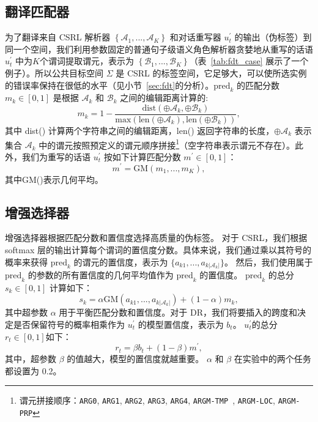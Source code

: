 \subsection{翻译匹配器}
为了翻译来自 CSRL 解析器 $\left\{\mathcal{A}_1, ..., \mathcal{A}_K\right\}$ 和对话重写器 $u_t^{\prime}$ 的输出（伪标签）到同一个空间，我们利用参数固定的普通句子级语义角色解析器贪婪地从重写的话语 $u_t^{\prime}$ 中为$K$个谓词提取谓元，表示为 $\left\{\mathcal{B}_1, ..., \mathcal{B}_K\right\}$（表~\ref{tab:fdt_case} 展示了一个例子）。所以公共目标空间 $\Sigma$ 是 CSRL 的标签空间，它足够大，可以使所选实例的错误率保持在很低的水平（见小节~\ref{sec:fdt}的分析）。$\text{pred}_k$ 的匹配分数 $m_{k} \in [0,1]$ 是根据 $\mathcal{A}_k$ 和 $\mathcal{B}_k$ 之间的编辑距离计算的:
\begin{equation}
    m_{k} = 1 - \frac{\textrm{dist}(\oplus \mathcal{A}_k, \oplus \mathcal{B}_k)}{\textrm{max}(\textrm{len}(\oplus \mathcal{A}_k), \textrm{len}(\oplus \mathcal{B}_k))}, \nonumber
\end{equation}
其中 dist() 计算两个字符串之间的编辑距离，\textrm{len()} 返回字符串的长度，$\oplus \mathcal{A}_k$ 表示集合 $\mathcal{A}_k$ 中的谓元按照预定义的谓元顺序拼接\footnote{谓元拼接顺序：\texttt{ARG0}, \texttt{ARG1}, \texttt{ARG2}, \texttt{ARG3}, \texttt{ARG4}, \texttt{ARGM-TMP }, \texttt{ARGM-LOC}, \texttt{ARGM-PRP}}（空字符串表示谓元不存在）。此外，我们为重写的话语 $u_t^{\prime}$ 按如下计算匹配分数 $m^{\prime} \in [0,1]$：
\begin{equation}
    m^{\prime} = \textrm{GM}(m_1,...,m_K), \nonumber
\end{equation}
其中GM()表示几何平均。

\subsection{增强选择器}
增强选择器根据匹配分数和置信度选择高质量的伪标签。 对于 CSRL，我们根据 softmax 层的输出计算每个谓词的置信度分数。具体来说，我们通过乘以其符号的概率来获得 $\text{pred}_k$ 的谓元的置信度，表示为 $\{a_{k1}, ..., a_{k|\mathcal{A}_k |}\}$。 然后，我们使用属于 $\text{pred}_k$ 的参数的所有置信度的几何平均值作为 $\text{pred}_k$ 的置信度。 $\text{pred}_k$ 的总分 $s_{k} \in [0,1]$ 计算如下：
\begin{equation}
    s_k = \alpha \textrm{GM}(a_{k1}, ..., a_{k|\mathcal{A}_k|}) + (1 - \alpha) m_{k},\nonumber
\end{equation}
其中超参数 $\alpha$ 用于平衡匹配分数和置信度。对于 DR，我们将要插入的跨度和决定是否保留符号的概率相乘作为 $u_t^{\prime}$ 的模型置信度，表示为 $b_{t}$。 $u_t^{\prime}$的总分$r_t \in [0,1]$如下：
\begin{equation}
    r_t = \beta b_t + (1 - \beta)m^{\prime},\nonumber
\end{equation}
其中，超参数 $\beta$ 的值越大，模型的置信度就越重要。 $\alpha$ 和 $\beta$ 在实验中的两个任务都设置为 0.2。


